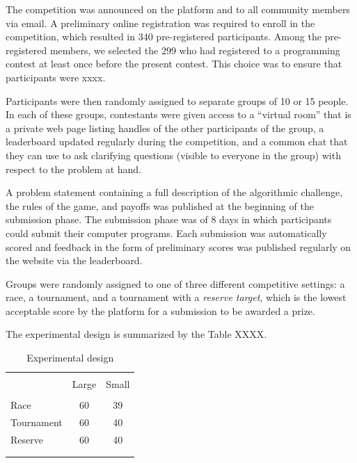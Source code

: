 \documentclass[12pt,]{article}
\begin{document}
The competition was announced on the platform and to all community
members via email. A preliminary online registration was required to
enroll in the competition, which resulted in 340 pre-registered
participants. Among the pre-registered members, we selected the 299 who
had registered to a programming contest at least once before the present
contest. This choice was to ensure that participants were xxxx.

Participants were then randomly assigned to separate groups of 10 or 15
people. In each of these groups, contestants were given access to a
``virtual room'' that is a private web page listing handles of the other
participants of the group, a leaderboard updated regularly during the
competition, and a common chat that they can use to ask clarifying
questions (visible to everyone in the group) with respect to the problem
at hand.

A problem statement containing a full description of the algorithmic
challenge, the rules of the game, and payoffs was published at the
beginning of the submission phase. The submission phase was of 8 days in
which participants could submit their computer programs. Each submission
was automatically scored and feedback in the form of preliminary scores
was published regularly on the website via the leaderboard.

Groups were randomly assigned to one of three different competitive
settings: a race, a tournament, and a tournament with a \emph{reserve
target}, which is the lowest acceptable score by the platform for a
submission to be awarded a prize.

The experimental design is summarized by the Table XXXX.

\begin{table}
\centering
\caption{Experimental design}
\label{tab: experimental design}
\begin{tabular}{@{}lcc}
  \\[-1.8ex]\hline \hline \\[-1.8ex]
 & Large & Small \\ 
  \hline \\[-1.86ex]
Race & 60 & 39 \\ 
  Tournament & 60 & 40 \\ 
  Reserve & 60 & 40 \\ 
   \\[-1.8ex]\hline \hline \\[-1.8ex]
\end{tabular}
\end{table}
\end{document}
